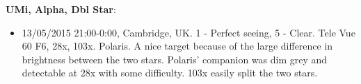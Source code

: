 {\bf UMi, Alpha, Dbl Star}:
\begin{itemize}
\item 13/05/2015 21:00-0:00, Cambridge, UK. 1 - Perfect seeing, 5 - Clear. Tele Vue 60 F6, 28x, 103x. Polaris. A nice target because of the large difference in brightness between the two stars. Polaris' companion was dim grey and detectable at 28x with some difficulty. 103x easily split the two stars. 
\end{itemize}
